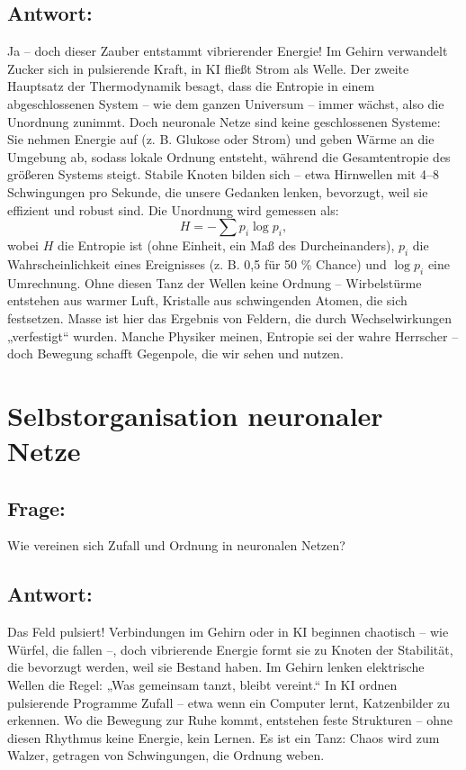 \documentclass{article}
\begin{document}
	\subsection*{Antwort:}
	Ja – doch dieser Zauber entstammt vibrierender Energie! Im Gehirn verwandelt Zucker sich in pulsierende Kraft, in KI fließt Strom als Welle. Der zweite Hauptsatz der Thermodynamik besagt, dass die Entropie in einem abgeschlossenen System – wie dem ganzen Universum – immer wächst, also die Unordnung zunimmt. Doch neuronale Netze sind keine geschlossenen Systeme: Sie nehmen Energie auf (z. B. Glukose oder Strom) und geben Wärme an die Umgebung ab, sodass lokale Ordnung entsteht, während die Gesamtentropie des größeren Systems steigt. Stabile Knoten bilden sich – etwa Hirnwellen mit 4–8 Schwingungen pro Sekunde, die unsere Gedanken lenken, bevorzugt, weil sie effizient und robust sind. Die Unordnung wird gemessen als:
	\begin{equation}
		H = -\sum p_i \log p_i,
	\end{equation}
	wobei $H$ die Entropie ist (ohne Einheit, ein Maß des Durcheinanders), $p_i$ die Wahrscheinlichkeit eines Ereignisses (z. B. 0{,}5 für 50 \% Chance) und $\log p_i$ eine Umrechnung. Ohne diesen Tanz der Wellen keine Ordnung – Wirbelstürme entstehen aus warmer Luft, Kristalle aus schwingenden Atomen, die sich festsetzen. Masse ist hier das Ergebnis von Feldern, die durch Wechselwirkungen „verfestigt“ wurden. Manche Physiker meinen, Entropie sei der wahre Herrscher – doch Bewegung schafft Gegenpole, die wir sehen und nutzen.
	
	\section{Selbstorganisation neuronaler Netze}
	
	\subsection*{Frage:}
	Wie vereinen sich Zufall und Ordnung in neuronalen Netzen?
	
	\subsection*{Antwort:}
	Das Feld pulsiert! Verbindungen im Gehirn oder in KI beginnen chaotisch – wie Würfel, die fallen –, doch vibrierende Energie formt sie zu Knoten der Stabilität, die bevorzugt werden, weil sie Bestand haben. Im Gehirn lenken elektrische Wellen die Regel: „Was gemeinsam tanzt, bleibt vereint.“ In KI ordnen pulsierende Programme Zufall – etwa wenn ein Computer lernt, Katzenbilder zu erkennen. Wo die Bewegung zur Ruhe kommt, entstehen feste Strukturen – ohne diesen Rhythmus keine Energie, kein Lernen. Es ist ein Tanz: Chaos wird zum Walzer, getragen von Schwingungen, die Ordnung weben.
	
\end{document}

